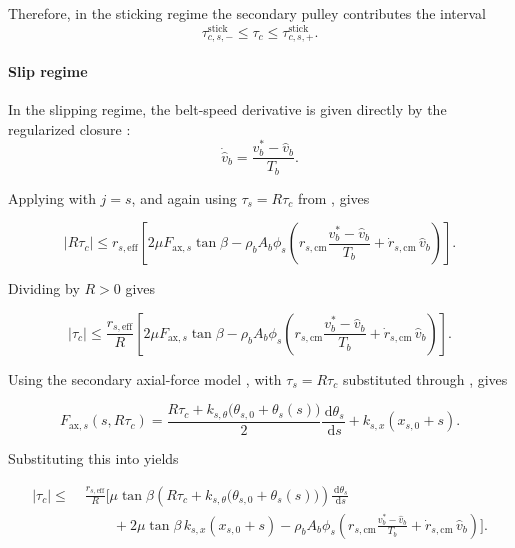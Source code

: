\documentclass[11pt]{article}
\numberwithin{equation}{section}
\newcommand{\dd}{\,\mathrm{d}}
\begin{document}
Therefore, in the sticking regime the secondary pulley contributes the interval
\begin{equation}
\boxed{
\tau_{c,s,-}^{\mathrm{stick}}
\le
\tau_c
\le
\tau_{c,s,+}^{\mathrm{stick}}.
}
\label{eq:secondary_tau_interval_stick}
\end{equation}

\paragraph{Slip regime}

In the slipping regime, the belt-speed derivative is given directly by the
regularized closure :
\[
\dot{\hat v}_b
=
\frac{v_b^\ast-\hat v_b}{T_b}.
\]

Applying  with \(j=s\), and again using
\(\tau_s = R\tau_c\) from , gives

\begin{equation}
|R\tau_c|
\le
r_{s,\mathrm{eff}}
\left[
2\mu F_{\mathrm{ax},s}\tan\beta
-
\rho_b A_b \phi_s
\left(
r_{s,\mathrm{cm}}\frac{v_b^\ast-\hat v_b}{T_b}
+
\dot r_{s,\mathrm{cm}}\,\hat v_b
\right)
\right].
\label{eq:tau_c_capacity_slip_start_secondary}
\end{equation}

Dividing by \(R>0\) gives

\begin{equation}
|\tau_c|
\le
\frac{r_{s,\mathrm{eff}}}{R}
\left[
2\mu F_{\mathrm{ax},s}\tan\beta
-
\rho_b A_b \phi_s
\left(
r_{s,\mathrm{cm}}\frac{v_b^\ast-\hat v_b}{T_b}
+
\dot r_{s,\mathrm{cm}}\,\hat v_b
\right)
\right].
\label{eq:tau_c_capacity_slip_start_secondary_divided}
\end{equation}

Using the secondary axial-force model , with
\(\tau_s = R\tau_c\) substituted through , gives

\begin{equation}
F_{\mathrm{ax},s}(s,R\tau_c)
=
\frac{
R\tau_c + k_{s,\theta}\!\bigl(\theta_{s,0}+\theta_s(s)\bigr)
}{2}
\frac{\dd \theta_s}{\dd s}
+
k_{s,x}(x_{s,0}+s).
\label{eq:Fax_s_sub_slip_tau_c}
\end{equation}

Substituting this into
 yields

\begin{equation}
\begin{aligned}
|\tau_c|
\le\;&
\frac{r_{s,\mathrm{eff}}}{R}
\Biggl[
\mu\tan\beta
\left(
R\tau_c
+
k_{s,\theta}\!\bigl(\theta_{s,0}+\theta_s(s)\bigr)
\right)
\frac{\dd \theta_s}{\dd s}
\\[4pt]
&\qquad
+
2\mu\tan\beta\,k_{s,x}(x_{s,0}+s)
-
\rho_b A_b \phi_s
\left(
r_{s,\mathrm{cm}}\frac{v_b^\ast-\hat v_b}{T_b}
+
\dot r_{s,\mathrm{cm}}\,\hat v_b
\right)
\Biggr].
\end{aligned}
\label{eq:tau_c_capacity_slip_explicit_secondary}
\end{equation}
\end{document}
